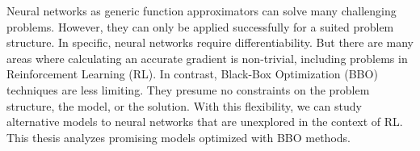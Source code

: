 

Neural networks as generic function approximators can solve many challenging problems. However, they can only be applied successfully for a suited problem structure. In specific, neural networks require differentiability. But there are many areas where calculating an accurate gradient is non-trivial, including problems in Reinforcement Learning (RL). In contrast, Black-Box Optimization (BBO) techniques are less limiting. They presume no constraints on the problem structure, the model, or the solution. With this flexibility, we can study alternative models to neural networks that are unexplored in the context of RL. This thesis analyzes promising models optimized with BBO methods.
\\
